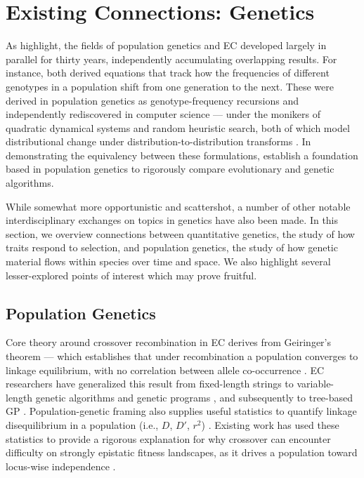 \section{Existing Connections: Genetics}
\label{sec:genetics}

As \citet{paixao2015toward} highlight, the fields of population genetics and EC developed largely in parallel for thirty years, independently accumulating overlapping results.  %
For instance, both derived equations that track how the frequencies of different genotypes in a population shift from one generation to the next.
These were derived in population genetics as genotype-frequency recursions \citep{lewontin1964interaction,slatkin1970selection} and independently rediscovered in computer science --- under the monikers of quadratic dynamical systems and random heuristic search, both of which model distributional change under distribution-to-distribution transforms \citep{rabinovich1992quadratic,rabani1998computational,vose1999random}.
In demonstrating the equivalency between these formulations, \citet{paixao2015toward} establish a foundation based in population genetics to rigorously compare evolutionary and genetic algorithms. %

While somewhat more opportunistic and scattershot, a number of other notable interdisciplinary exchanges on topics in genetics have also been made.
In this section, we overview connections between quantitative genetics, the study of how traits respond to selection, and population genetics, the study of how genetic material flows within species over time and space.
We also highlight several lesser-explored points of interest which may prove fruitful.

\subsection{Population Genetics}
\label{sec:population-genetics}

Core theory around crossover recombination in EC derives from Geiringer's theorem --- which establishes that under recombination a population converges to linkage equilibrium, with no correlation between allele co-occurrence \citep{geiringer1944probability}.
EC researchers have generalized this result from fixed-length strings to variable-length genetic algorithms and genetic programs \citep{poli2002allele}, and subsequently to tree-based GP \citep{mitavskiy2006results}.
Population-genetic framing also supplies useful statistics to quantify linkage disequilibrium in a population (i.e., $D$, $D'$, $r^2$) \citep{hill1968linkage}.
Existing work has used these statistics to provide a rigorous explanation for why crossover can encounter difficulty on strongly epistatic fitness landscapes, as it drives a population toward locus-wise independence \citep{chakraborty1997linkage}.  %


